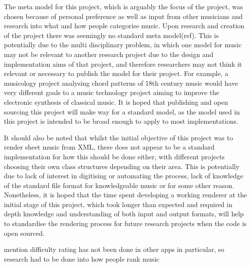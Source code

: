 The meta model for this project, which is arguably the focus of the project, was chosen because of personal preference as well as input from other musicians and research into what and how people categorise music. Upon research and creation of the project there was seemingly no standard meta model(ref). This is potentially due to the multi disciplinary problem, in which one model for music may not be relevant to another research project due to the design and implementation aims of that project, and therefore researchers may not think it relevant or necessary to publish the model for their project\parencite{MIR}. For example, a musicology project analysing chord patterns of 18th century music would have very different goals to a music technology project aiming to improve the electronic synthesis of classical music. It is hoped that publishing and open sourcing this project will make way for a standard model, as the model used in this project is intended to be broad enough to apply to most implementations. 

It should also be noted that whilst the initial objective of this project was to render sheet music from XML, there does not appear to be a standard implementation for how this should be done either, with different projects choosing their own class structures depending on their area\parencite{Music21}. This is potentially due to lack of interest in digitising or automating the process, lack of knowledge of the standard file format for knowledgeable music or for some other reason. Nonetheless, it is hoped that the time spent developing a working renderer at the initial stage of this project, which took longer than expected and required in depth knowledge and understanding of both input and output formats, will help to standardise the rendering process for future research projects when the code is open sourced.


mention difficulty rating has not been done in other apps in particular, so research had to be done into how people rank music
